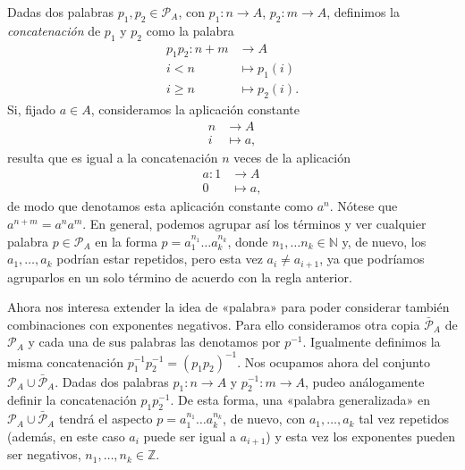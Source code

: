 \documentclass[12pt,a4paper]{book}
\theoremstyle{definition} \newtheorem{defn}[thm]{Definición}
\theoremstyle{definition} \newtheorem{ejemplo}[thm]{Ejemplo}
\theoremstyle{definition} \newtheorem{ejercicio}[thm]{Ejercicio}
\theoremstyle{remark} \newtheorem*{obs}{Observación}
\def\ZZ{\mathbb{Z}}
\def\NN{\mathbb{N}}
\begin{document}
Dadas dos palabras $p_1,p_2 \in \mathcal{P}_A$, con $p_1:n\rightarrow A$, $p_2:m\rightarrow A$, definimos la \emph{concatenación} de $p_1$ y $p_2$ como la palabra 
\begin{align*}
  p_1p_2 :n+m &\longrightarrow A\\ 
    i<n &\longmapsto p_1(i) \\
    i\geq n & \longmapsto p_2(i).
  \end{align*}
  Si, fijado $a\in A$, consideramos la aplicación constante 
  \begin{align*}
    n&\longrightarrow A\\ 
      i &\longmapsto a, 
    \end{align*}
    resulta que es igual a la concatenación $n$ veces de la aplicación
    \begin{align*}
      a :1&\longrightarrow A\\ 
        0 &\longmapsto a ,
      \end{align*}
      de modo que denotamos esta aplicación constante como $a^n$. Nótese que $a^{n+m}=a^na^m$. En general, podemos agrupar así los términos y ver cualquier palabra $p\in \mathcal{P}_A$ en la forma $p=a_1^{n_1}\dots a_k^{n_k}$, donde $n_1,\dots n_k\in \NN$ y, de nuevo, los $a_1,\dots,a_k$ podrían estar repetidos, pero esta vez $a_i\neq a_{i+1}$, ya que podríamos agruparlos en un solo término de acuerdo con la regla anterior.

      Ahora nos interesa extender la idea de «palabra» para poder considerar también combinaciones con exponentes negativos. Para ello consideramos otra copia $\bar{\mathcal{P}}_A$ de $\mathcal{P}_A$ y cada una de sus palabras las denotamos por $p^{-1}$. Igualmente definimos la misma concatenación $p_1^{-1}p_2^{-1}=(p_1p_2)^{-1}$. Nos ocupamos ahora del conjunto $\mathcal{P}_A \cup \bar{\mathcal{P}}_A$. Dadas dos palabras $p_1:n\rightarrow A$ y $p_2^{-1}:m\rightarrow A$, pudeo análogamente definir la concatenación $p_1p_2^{-1}$. De esta forma, una «palabra generalizada» en $\mathcal{P}_A\cup \bar{\mathcal{P}}_A$ tendrá el aspecto $p=a_{1}^{n_1}\dots a_k^{n_k}$, de nuevo, con $a_1,\dots,a_k$ tal vez repetidos (además, en este caso $a_i$ puede ser igual a $a_{i+1}$) y esta vez los exponentes pueden ser negativos, $n_1,\dots,n_k \in \ZZ$.
      
\end{document}
